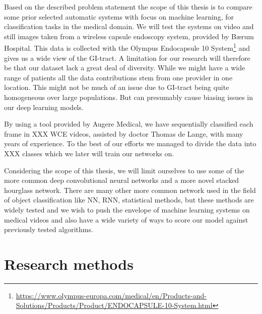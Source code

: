 \documentclass[thesis.tex]{subfiles}
\begin{document}
Based on the described problem statement the scope of this thesis is to compare some prior selected automatic systems with focus on machine learning, for classification tasks in the medical domain. We will test the systems on video and still images taken from a wireless capsule endoscopy system, provided by Bærum Hospital. 
This data is collected with the Olympus Endocapsule 10 System\footnote{\url{https://www.olympus-europa.com/medical/en/Products-and-Solutions/Products/Product/ENDOCAPSULE-10-System.html}} and gives us a wide view of the GI-tract. A limitation for our research will therefore be that our dataset lack a great deal of diversity. While we might have a wide range of patients all the data contributions stem from one provider in one location. This might not be much of an issue due to GI-tract being quite homogeneous over large populations. But can presumably cause biasing issues in our deep learning models. %

By using a tool provided by Augere Medical, we have sequentially classified each frame in XXX WCE videos, assisted by doctor Thomas de Lange, with many years of experience. To the best of our efforts we managed to divide the data into XXX classes which we later will train our networks on.

Considering the scope of this thesis, we will limit ourselves to use some of the more common deep convolutional neural networks and a more novel stacked hourglass network. There are many other more common network used in the field of object classification like NN, RNN, statistical methods, but these methods are widely tested and we wish to push the envelope of machine learning systems on medical videos and also have a wide variety of ways to score our model against previously tested algorithms.


\section{Research methods} \label{sec:research_methods}
\end{document}
